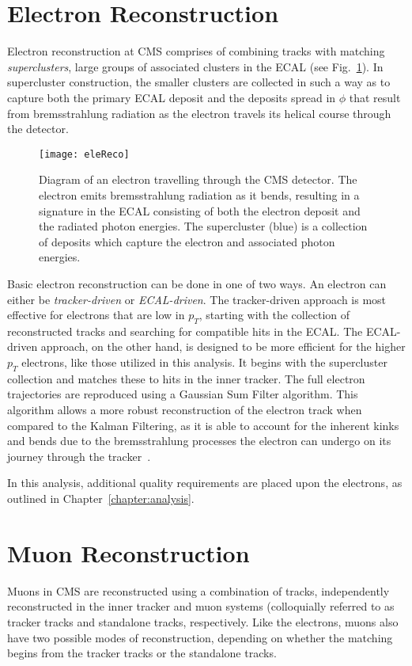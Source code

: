 \section{Electron Reconstruction} 
Electron reconstruction at CMS comprises of combining tracks with matching
\emph{superclusters}, large groups of associated clusters in the ECAL (see
Fig.~\ref{fig:eleReco}). In supercluster construction, the smaller clusters are
collected in such a way as to capture both the primary ECAL deposit and the
deposits spread in $\phi$ that result from bremsstrahlung radiation as the
electron travels its helical course through the detector.

\begin{figure}[h]
\centering
\texttt{[image: eleReco]}
\caption[Diagram of an electron and its signatures]{Diagram of an electron
travelling through the CMS detector. The electron emits bremsstrahlung radiation
as it bends, resulting in a signature in the ECAL consisting of both the
electron deposit and the radiated photon energies. The supercluster (blue) is a
collection of deposits which capture the electron and associated photon
energies.}
\label{fig:eleReco}
\end{figure}

Basic electron reconstruction can be done in one of two ways. An electron can
either be \emph{tracker-driven} or \emph{ECAL-driven}. The tracker-driven
approach is most effective for electrons that are low in $p_{T}$, starting 
with the collection of reconstructed tracks and searching for compatible hits in
the ECAL. The ECAL-driven approach, on the other hand, is designed to be more
efficient for the higher $p_{T}$ electrons, like those utilized in this
analysis. It begins with the supercluster collection and matches these to hits
in the inner tracker. The full electron trajectories are reproduced using a
Gaussian Sum Filter algorithm. This algorithm allows a more robust reconstruction
of the electron track when compared to the Kalman Filtering, as it is able to
account for the inherent kinks and bends due to the bremsstrahlung processes
the electron can undergo on its journey through the tracker~\cite{gsfElectrons}.


In this analysis, additional quality requirements are placed upon the electrons,
as outlined in Chapter~\ref{chapter:analysis}.

\section{Muon Reconstruction}
Muons in CMS are reconstructed using a combination of tracks, independently
reconstructed in the inner tracker and muon systems (colloquially referred to as
tracker tracks and standalone tracks, respectively. Like the electrons, muons
also have two possible modes of reconstruction, depending on whether the
matching begins from the tracker tracks or the standalone tracks.

